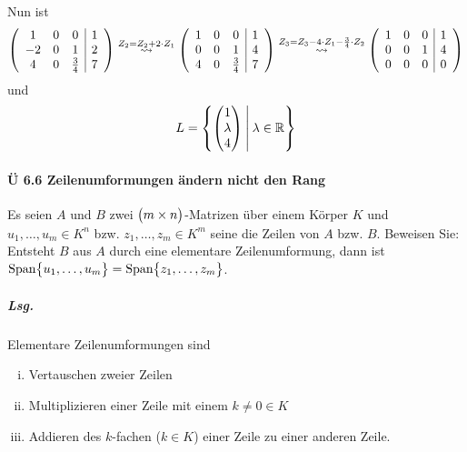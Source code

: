 \documentclass{scrreprt}
\begin{document}
\begin{enumerate}[(a)]
  Nun ist
  \[
    \qty(\begin{array}{ccc|c}
      1  & 0 & 0           & 1 \\
      -2 & 0 & 1           & 2 \\
      4  & 0 & \frac{3}{4} & 7 \\
    \end{array})
    \overset{Z_2 = Z_2 + 2 \cdot Z_1}\leadsto
    \qty(\begin{array}{ccc|c}
      1 & 0 & 0           & 1 \\
      0 & 0 & 1           & 4 \\
      4 & 0 & \frac{3}{4} & 7 \\
    \end{array})
    \overset{Z_3 = Z_3 - 4 \cdot Z_1 - \frac{3}{4} \cdot Z_2}\leadsto
    \qty(\begin{array}{ccc|c}
      1 & 0 & 0 & 1 \\
      0 & 0 & 1 & 4 \\
      0 & 0 & 0 & 0 \\
    \end{array})
  \]
  und
  \[
    L = \qty{\begin{pmatrix}
      1 \\
      \lambda \\
      4 \\
    \end{pmatrix} \:\middle|\: \lambda \in \mathbb{R}}
  \]
\end{enumerate}

\newpage
\paragraph{Ü 6.6 Zeilenumformungen ändern nicht den Rang}
Es seien $A$ und $B$ zwei $\qty\big(m \times n)$-Matrizen über einem Körper $K$
und $u_1, \ldots, u_m \in K^n$ bzw. $z_1, \ldots, z_m \in K^m$ seine die Zeilen von
$A$ bzw. $B$.
Beweisen Sie: Entsteht $B$ aus $A$ durch eine elementare Zeilenumformung, dann
ist
$\text{Span}\qty\big{u_1, \ldots, u_m} = \text{Span}\qty\big{z_1, \ldots, z_m}$.

\subparagraph{Lsg.} Elementare Zeilenumformungen sind
\begin{enumerate}[(i)]
\item Vertauschen zweier Zeilen
\item Multiplizieren einer Zeile mit einem $k \ne 0 \in K$
\item Addieren des $k$-fachen ($k \in K$) einer Zeile zu einer anderen Zeile.
\end{enumerate}
\end{document}
